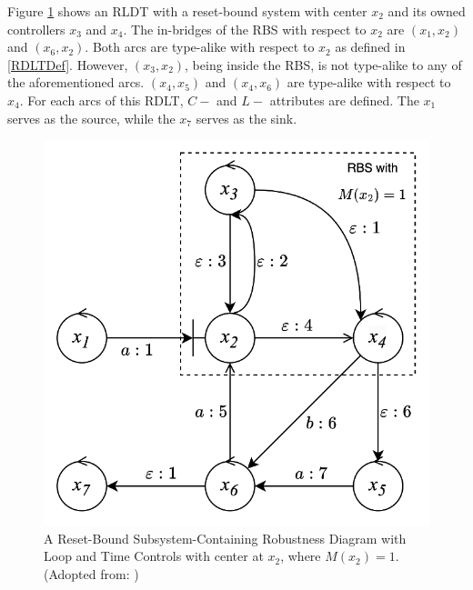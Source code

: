 Figure \ref{sampleRDLT} shows an RLDT with a reset-bound system with center $x_2$ and its owned controllers $x_3$ and $x_4$. The in-bridges of the RBS with respect to $x_2$ are $(x_1, x_2)$ and $(x_6,x_2)$. Both arcs are type-alike with respect to $x_2$ as defined in \ref{RDLTDef}. However, $(x_3,x_2)$, being inside the RBS, is not type-alike to any of the aforementioned arcs. $(x_4, x_5)$ and $(x_4, x_6)$ are type-alike with respect to $x_4$.
For each arcs of this RDLT, $C-$ and $L-$ attributes are defined. The $x_1$ serves as the source, while the $x_7$ serves as the sink. 
\begin{figure} [H]
    \centering
    \includegraphics[]{../figures/sampleRDLTmain.png}
    \caption{A Reset-Bound Subsystem-Containing Robustness Diagram with Loop and Time Controls with center at $x_2$, where $M(x_2)=1$. (Adopted from: \cite{MalinaoWCTP2023})}
    \label{sampleRDLT}
\end{figure}

